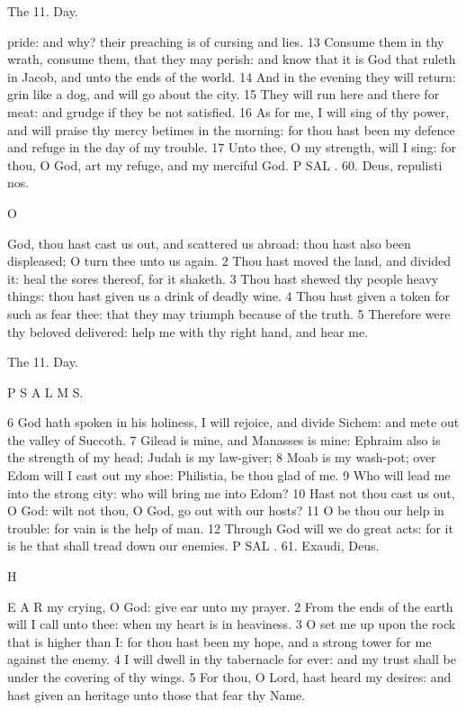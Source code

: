 The 11. Day.

pride: and why? their preaching is of cursing and lies. 13 Consume them in thy wrath, consume them, that they may perish: and know that it is God that ruleth in Jacob, and unto the ends of the world. 14 And in the evening they will return: grin like a dog, and will go about the city. 15 They will run here and there for meat: and grudge if they be not satisfied. 16 As for me, I will sing of thy power, and will praise thy mercy betimes in the morning: for thou hast been my defence and refuge in the day of my trouble. 17 Unto thee, O my strength, will I sing: for thou, O God, art my refuge, and my merciful God. P SAL . 60. Deus, repulisti nos.

O

God, thou hast cast us out, and scattered us abroad: thou hast also been displeased; O turn thee unto us again. 2 Thou hast moved the land, and divided it: heal the sores thereof, for it shaketh. 3 Thou hast shewed thy people heavy things: thou hast given us a drink of deadly wine. 4 Thou hast given a token for such as fear thee: that they may triumph because of the truth. 5 Therefore were thy beloved delivered: help me with thy right hand, and hear me.

The 11. Day.

P S A L M S.

6 God hath spoken in his holiness, I will rejoice, and divide Sichem: and mete out the valley of Succoth. 7 Gilead is mine, and Manasses is mine: Ephraim also is the strength of my head; Judah is my law-giver; 8 Moab is my wash-pot; over Edom will I cast out my shoe: Philistia, be thou glad of me. 9 Who will lead me into the strong city: who will bring me into Edom? 10 Hast not thou cast us out, O God: wilt not thou, O God, go out with our hosts? 11 O be thou our help in trouble: for vain is the help of man. 12 Through God will we do great acts: for it is he that shall tread down our enemies. P SAL . 61. Exaudi, Deus.

H

E A R my crying, O God: give ear unto my prayer. 2 From the ends of the earth will I call unto thee: when my heart is in heaviness. 3 O set me up upon the rock that is higher than I: for thou hast been my hope, and a strong tower for me against the enemy. 4 I will dwell in thy tabernacle for ever: and my trust shall be under the covering of thy wings. 5 For thou, O Lord, hast heard my desires: and hast given an heritage unto those that fear thy Name.

